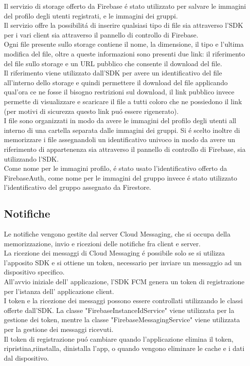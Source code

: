 Il servizio di storage offerto da Firebase \'e stato utilizzato per salvare le immagini del profilo degli utenti registrati, e le immagini dei gruppi.\\
Il servizio offre la possibilit\'a di inserire qualsiasi tipo di file sia attraverso l'SDK per i vari client sia attraverso il pannello di controllo di Firebase.\\
Ogni file presente sullo storage contiene il nome, la dimensione, il tipo e l'ultima modifica del file, oltre a queste informazioni sono presenti due link: il riferimento del file sullo storage e un URL pubblico che consente il download del file.\\
Il riferimento viene utilizzato dall'SDK per avere un identificativo del file all'interno dello storage e quindi permettere il download del file applicando qual'ora ce ne fosse il bisogno restrizioni sul download, il link pubblico invece permette di visualizzare e scaricare il file a tutti coloro che ne possiedono il link (per motivi di sicurezza questo link pu\'o essere rigenerato).\\
I file sono organizzati in modo da avere le immagini del profilo degli utenti all interno di una cartella separata dalle immagini dei gruppi.\@
Si \'e scelto inoltre di memorizzare i file assegnandoli un identificativo univoco in modo da avere un riferimento di appartenenza sia attraverso il pannello di controllo di Firebase, sia utilizzando l'SDK.\\
Come nome per le immagini profilo, \'e stato usato l'identificativo offerto da FirebaseAuth, come nome per le immagini del gruppo invece \'e stato utilizzato l'identificativo del gruppo assegnato da Firestore.


\subsection{Notifiche}
Le notifiche vengono gestite dal server Cloud Messaging, che si occupa della memorizzazione, invio e ricezioni delle notifiche fra client e server.\\
La ricezione dei messaggi di Cloud Messaging \'e possibile solo se si utilizza l'apposito SDK e si ottiene un token, necessario per inviare un messaggio ad un dispositivo specifico.\\
All'avvio iniziale dell' applicazione, l'SDK FCM genera un token di registrazione per l'istanza dell' applicazione client.\\
I token e la ricezione dei messaggi possono essere controllati utilizzando le classi offerte dall'SDK.
La classe "FirebaseInstanceIdService" viene utilizzata per la gestione dei token, mentre la classe "FirebaseMessagingService" viene utilizzata per la gestione dei messaggi ricevuti.\\
Il token di registrazione pu\'o cambiare quando l'applicazione elimina il token, ripristina,riinstalla, dinistalla l'app, o quando vengono eliminare le cache e i dati dal dispositivo.


